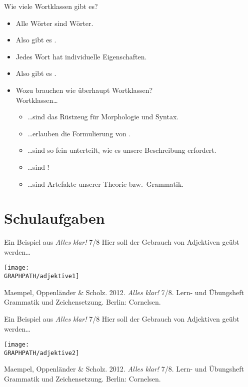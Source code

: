 \begin{frame}
  {Wie viele Wortklassen gibt es?}
  \pause
  \begin{itemize}[<+->]
    \item Alle Wörter sind \alert{Wörter}.
    \item Also gibt es .
      \Zeile
    \item Jedes Wort hat \alert{individuelle Eigenschaften}.
    \item Also gibt es .
      \Zeile
    \item Wozu brauchen wie überhaupt Wortklassen?\\
      Wortklassen\dots
      \begin{itemize}[<+->]
        \item \dots sind \alert{das Rüstzeug für Morphologie und Syntax}.
        \item \dots erlauben die Formulierung von .
        \item \dots sind so fein unterteilt, wie es unsere Beschreibung erfordert.
        \item \dots sind !
        \item \dots sind \alert{Artefakte unserer Theorie bzw.\ Grammatik}.
      \end{itemize}
  \end{itemize}
\end{frame}


\section{Schulaufgaben}

\begin{frame}
  {Ein Beispiel aus \textit{Alles klar!} 7\slash 8}
  Hier soll der Gebrauch von \alert{Adjektiven} geübt werden\ldots
  \begin{center}
    \texttt{[image: \\GRAPHPATH/adjektive1]}
  \end{center}
  \tiny Maempel, Oppenländer \& Scholz. 2012. \textit{Alles klar!} 7\slash 8. Lern- und Übungsheft Grammatik und Zeichensetzung. Berlin: Cornelsen.
\end{frame}


\begin{frame}
  {Ein Beispiel aus \textit{Alles klar!} 7\slash 8}
  Hier soll der Gebrauch von \alert{Adjektiven} geübt werden\ldots
  \begin{center}
    \texttt{[image: \\GRAPHPATH/adjektive2]}
  \end{center}
  \tiny Maempel, Oppenländer \& Scholz. 2012. \textit{Alles klar!} 7\slash 8. Lern- und Übungsheft Grammatik und Zeichensetzung. Berlin: Cornelsen.
\end{frame}


